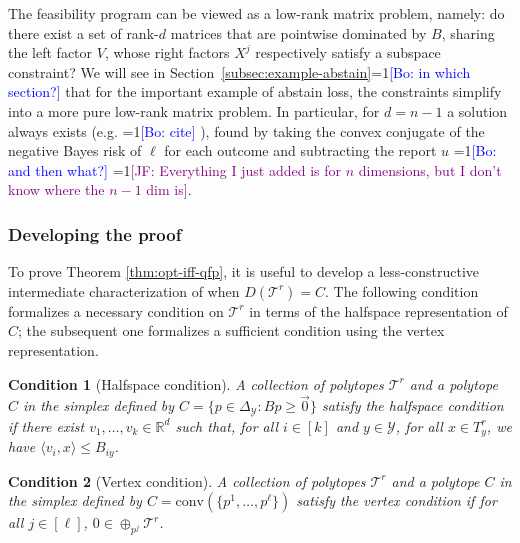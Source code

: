 \documentclass[anon]{colt2020} %
\newcommand{\Comments}{1}
\newcommand{\mynote}[2]{\ifnum\Comments=1\textcolor{#1}{#2}\fi}
\newcommand{\jessie}[1]{\mynote{purple}{[JF: #1]}}
\newcommand{\bo}[1]{\mynote{blue}{[Bo: #1]}}
\newcommand{\reals}{\mathbb{R}}
\newcommand{\simplex}{\Delta_\Y}
\newcommand{\T}{\mathcal{T}}
\newcommand{\Y}{\mathcal{Y}}
\newcommand{\inprod}[2]{\langle #1, #2 \rangle}%
\newcommand{\conv}{\mathrm{conv}}
\newtheorem{condition}{Condition}
\begin{document}
The feasibility program can be viewed as a low-rank matrix problem, namely: do there exist a set of rank-$d$ matrices that are pointwise dominated by $B$, sharing the left factor $V$, whose right factors $X^j$ respectively satisfy a subspace constraint?
We will see in Section~\ref{subsec:example-abstain}\bo{in which section?} that for the important example of abstain loss, the constraints simplify into a more pure low-rank matrix problem.
In particular, for $d=n-1$ a solution always exists (e.g. \bo{cite} \cite[Theorem 2]{finocchiaro2019embedding}), found by taking the convex conjugate of the negative Bayes risk of $\ell$ for each outcome and subtracting the report $u$ \bo{and then what?} \jessie{Everything I just added is for $n$ dimensions, but I don't know where the $n-1$ dim is}.


\subsubsection{Developing the proof}

To prove Theorem \ref{thm:opt-iff-qfp}, it is useful to develop a less-constructive intermediate characterization of when $D(\T^r) = C$.
The following condition formalizes a necessary condition on $\T^r$ in terms of the halfspace representation of $C$; the subsequent one formalizes a sufficient condition using the vertex representation.


\begin{condition}[Halfspace condition]\label{cond:H-condition}
	A collection of polytopes $\T^r$ and a polytope $C$ in the simplex defined by $C = \{p \in \simplex : Bp \geq \vec 0\}$ \emph{satisfy the halfspace condition} if there exist $v_1, \ldots, v_k \in \reals^d$ such that, for all $i \in [k]$ and $y \in \Y$, for all $x \in T^r_y$, we have $\inprod{v_i}{x} \leq B_{iy}$.
\end{condition}
\begin{condition}[Vertex condition]\label{cond:V-condition}
	A collection of polytopes $\T^r$ and a polytope $C$ in the simplex defined by $C = \conv(\{p^1, \ldots, p^\ell\})$ \emph{satisfy the vertex condition} if for all $j \in [\ell]$, $0 \in \oplus_{p^j} \T^r$. %
\end{condition}
\end{document}
